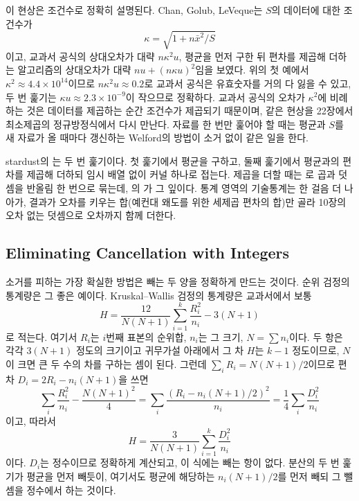 이 현상은 조건수로 정확히 설명된다. Chan, Golub, LeVeque는 $S$의 데이터에 대한 조건수가
\[
\kappa=\sqrt{1+n\bar x^2/S}
\]
이고, 교과서 공식의 상대오차가 대략 $n\kappa^2u$, 평균을 먼저 구한 뒤 편차를 제곱해 더하는  알고리즘의 상대오차가 대략 $nu+(n\kappa u)^2$임을 보였다\cite{chan1983variance}. 위의 첫 예에서 $\kappa^2\approx4.4\times10^{14}$이므로 $n\kappa^2u\approx0.2$로 교과서 공식은 유효숫자를 거의 다 잃을 수 있고, 두 번 훑기는 $\kappa u\approx2.3\times10^{-9}$이 작으므로 정확하다. 교과서 공식의 오차가 $\kappa^2$에 비례하는 것은 데이터를 제곱하는 순간 조건수가 제곱되기 때문이며, 같은 현상을 22장에서 최소제곱의 정규방정식에서 다시 만난다. 자료를 한 번만 훑어야 할 때는 평균과 $S$를 새 자료가 올 때마다 갱신하는 Welford의 방법이 소거 없이 같은 일을 한다\cite{welford1962}.

\begin{instardust}
stardust의 는 두 번 훑기이다. 첫 훑기에서 평균을 구하고, 둘째 훑기에서 평균과의 편차를 제곱해 더하되 임시 배열 없이 커널 하나로 접는다. 제곱을 더할 때는 로 곱과 덧셈을 반올림 한 번으로 묶는데, 의 가 그 잎이다. 통계 영역의 기술통계는 한 걸음 더 나아가, 결과가 오차를 키우는 합(예컨대 왜도를 위한 세제곱 편차의 합)만 골라 10장의 오차 없는 덧셈으로 오차까지 함께 더한다.
\end{instardust}

\subsection{Eliminating Cancellation with Integers}

소거를 피하는 가장 확실한 방법은 빼는 두 양을 정확하게 만드는 것이다. 순위 검정의 통계량은 그 좋은 예이다. Kruskal--Wallis 검정의 통계량은 교과서에서 보통
\[
H=\frac{12}{N(N+1)}\sum_{i=1}^k\frac{R_i^2}{n_i}-3(N+1)
\]
로 적는다. 여기서 $R_i$는 $i$번째 표본의 순위합, $n_i$는 그 크기, $N=\sum n_i$이다. 두 항은 각각 $3(N+1)$ 정도의 크기이고 귀무가설 아래에서 그 차 $H$는 $k-1$ 정도이므로, $N$이 크면 큰 두 수의 차를 구하는 셈이 된다. 그런데 $\sum_iR_i=N(N+1)/2$이므로 편차 $D_i=2R_i-n_i(N+1)$을 쓰면
\[
\sum_i\frac{R_i^2}{n_i}-\frac{N(N+1)^2}4=\sum_i\frac{(R_i-n_i(N+1)/2)^2}{n_i}=\frac14\sum_i\frac{D_i^2}{n_i}
\]
이고, 따라서
\[
H=\frac{3}{N(N+1)}\sum_{i=1}^k\frac{D_i^2}{n_i}
\]
이다. $D_i$는 정수이므로 정확하게 계산되고, 이 식에는 빼는 항이 없다. 분산의 두 번 훑기가 평균을 먼저 빼듯이, 여기서도 평균에 해당하는 $n_i(N+1)/2$를 먼저 빼되 그 뺄셈을 정수에서 하는 것이다.

